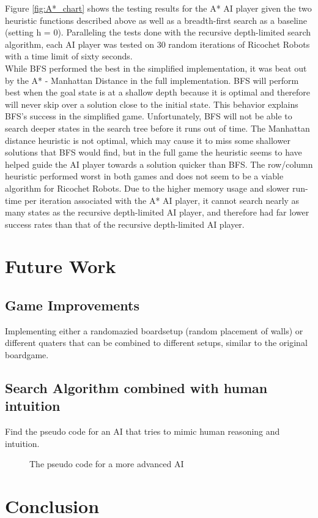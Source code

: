 \documentclass[a4paper,10pt]{article}
\begin{document}
  Figure \ref{fig:A*_chart} shows the testing results for the A* AI player given the two heuristic functions described above as well as a breadth-first search as a
  baseline (setting h = 0).  Paralleling the tests done with the recursive depth-limited search algorithm, each AI player was tested on 30 random iterations of Ricochet
  Robots with a time limit of sixty seconds. \\

  While BFS performed the best in the simplified implementation, it was beat out by the A* - Manhattan Distance in the full implementation.  BFS will perform best when
  the goal state is at a shallow depth because it is optimal and therefore will never skip over a solution close to the initial state.  This behavior explains BFS's
  success in the simplified game.  Unfortunately, BFS will not be able to search deeper states in the search tree before it runs out of time.  The Manhattan distance
  heuristic is not optimal, which may cause it to miss some shallower solutions that BFS would find, but in the full game the heuristic seems to have helped guide the AI
  player towards a solution quicker than BFS.  The row/column heuristic performed worst in both games and does not seem to be a viable algorithm for Ricochet Robots.
  Due to the higher memory usage and slower run-time per iteration associated with the A* AI player, it cannot search nearly as many states as the recursive depth-limited
  AI player, and therefore had far lower success rates than that of the recursive depth-limited AI player.

\section{Future Work}
\subsection{Game Improvements}
Implementing either a randomazied boardsetup (random placement of walls) or different quaters that can be combined to different setups, similar to the original boardgame.
\subsection{Search Algorithm combined with human intuition}
Find the pseudo code for an AI that tries to mimic human reasoning and intuition. 
\begin{figure}
\caption{The pseudo code for a more advanced AI}
\label{fig:pseudo}
\end{figure}

\section{Conclusion}
\end{document}
